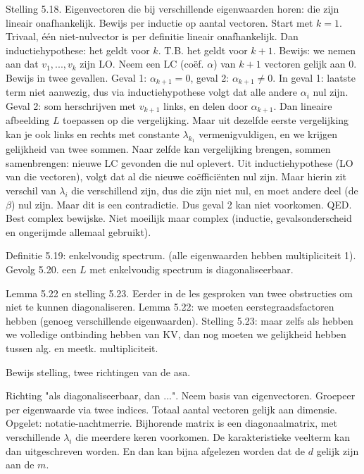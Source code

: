 \documentclass{article}
\begin{document}
Stelling 5.18.  Eigenvectoren die bij verschillende eigenwaarden horen: die zijn lineair onafhankelijk. Bewijs per inductie op aantal vectoren. Start met $k=1$. Trivaal, \'e\'en niet-nulvector is per definitie lineair onafhankelijk. Dan inductiehypothese: het geldt voor $k$. T.B. het geldt voor $k+1$. 
Bewijs: we nemen aan dat  $v_1,...,v_k$ zijn LO.  
Neem een LC (co\"ef. $\alpha$) van $k+1$ vectoren gelijk aan 0. Bewijs in twee gevallen. Geval 1: $\alpha_{k+1}=0$, geval 2: $\alpha_{k+1} \neq 0$. In geval 1: laatste term niet aanwezig, dus via inductiehypothese volgt dat alle andere $\alpha_i$ nul zijn. Geval 2: som herschrijven met $v_{k+1}$ links, en delen door $\alpha_{k+1}$. Dan lineaire afbeelding $L$ toepassen op die vergelijking. Maar uit dezelfde eerste vergelijking kan je ook links en rechts met constante $\lambda_{k_1}$ vermenigvuldigen, en we krijgen gelijkheid van twee sommen. Naar zelfde kan vergelijking brengen, sommen samenbrengen: nieuwe LC gevonden die nul oplevert. Uit inductiehypothese (LO van die vectoren), volgt dat al die nieuwe co\"effici\"enten nul zijn. Maar hierin zit verschil van $\lambda_i$ die verschillend zijn, dus die zijn niet nul, en moet andere deel (de $\beta$) nul zijn. Maar dit is een contradictie. Dus geval 2 kan niet voorkomen. QED. Best complex bewijske. Niet moeilijk maar complex (inductie, gevalsonderscheid en ongerijmde allemaal gebruikt). 

Definitie 5.19: enkelvoudig spectrum. (alle eigenwaarden hebben multipliciteit 1). Gevolg 5.20. een $L$ met enkelvoudig spectrum is diagonaliseerbaar. 

Lemma 5.22 en stelling 5.23. Eerder in de les gesproken van twee obstructies om niet te kunnen diagonaliseren. 
Lemma 5.22: we moeten eerstegraadsfactoren hebben (genoeg verschillende eigenwaarden). Stelling 5.23: maar zelfs als hebben we volledige ontbinding hebben van KV, dan nog moeten we gelijkheid hebben tussen alg. en meetk. multipliciteit. 

Bewijs stelling, twee richtingen van de asa. 

Richting "als diagonaliseerbaar, dan ...". Neem basis van eigenvectoren. Groepeer per eigenwaarde via twee indices. Totaal aantal vectoren gelijk aan dimensie. Opgelet: notatie-nachtmerrie. Bijhorende matrix is een diagonaalmatrix, met verschillende $\lambda_i$ die meerdere keren voorkomen. De karakteristieke veelterm kan dan uitgeschreven worden. En dan kan bijna afgelezen worden dat de $d$ gelijk zijn aan de $m$. 
\end{document}
